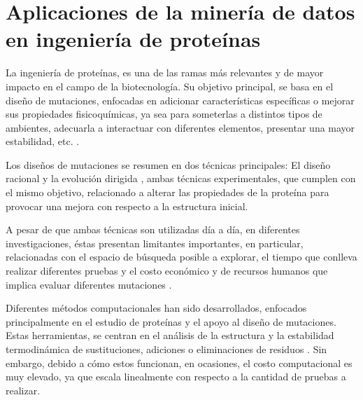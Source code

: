 
\chapter{Aplicaciones de la minería de datos en ingeniería de proteínas}  %

\ifpdf
    \graphicspath{{Chapter1/Figs/Raster/}{Chapter1/Figs/PDF/}{Chapter1/Figs/}}
\else
    \graphicspath{{Chapter1/Figs/Vector/}{Chapter1/Figs/}}
\fi

La ingeniería de proteínas, es una de las ramas más relevantes y de mayor impacto en el campo de la biotecnología. Su objetivo principal, se basa en el diseño de mutaciones, enfocadas en adicionar características específicas o mejorar sus propiedades fisicoquímicas, ya sea para someterlas a distintos tipos de ambientes, adecuarla a interactuar con diferentes elementos, presentar una mayor estabilidad, etc. \cite{lutz2009protein}.

Los diseños de mutaciones se resumen en dos técnicas principales: El diseño racional \cite{carpenter1997rational} y la evolución dirigida \cite{arnold1998design}, ambas técnicas experimentales, que cumplen con el mismo objetivo, relacionado a alterar las propiedades de la proteína para provocar una mejora con respecto a la estructura inicial.

A pesar de que ambas técnicas son utilizadas día a día, en diferentes investigaciones, éstas presentan limitantes importantes, en particular, relacionadas con el espacio de búsqueda posible a explorar, el tiempo que conlleva realizar diferentes pruebas y el costo económico y de recursos humanos que implica evaluar diferentes mutaciones \cite{Reetz2008}. 

Diferentes métodos computacionales han sido desarrollados, enfocados principalmente en el estudio de proteínas y el apoyo al diseño de mutaciones. Estas herramientas, se centran en el análisis de la estructura y la estabilidad termodinámica de sustituciones, adiciones o eliminaciones de residuos \cite{Schymkowitz2005, Khan2010, Pandurangan2017, Olivera-Nappa2011}. Sin embargo, debido a cómo estos funcionan, en ocasiones, el costo computacional es muy elevado, ya que escala linealmente con respecto a la cantidad de pruebas a realizar. 


